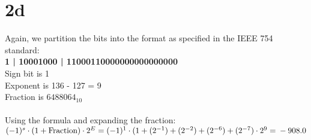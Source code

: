 \documentclass[10pt,a4paper]{article}
\begin{document}
	\section*{2d}
	Again, we partition the bits into the format as specified in the IEEE 754 standard: \\
	\textbf{1 | 10001000 | 11000110000000000000000} \\
	Sign bit is 1 \\
	Exponent is 136 - 127 = 9\\
	Fraction is $6488064_{10}$ \\\\
	Using the formula and expanding the fraction: \\ $(-1)^s \cdot (1 + \text{Fraction}) \cdot 2^E = \\ (-1)^1 \cdot (1 + (2^{-1}) + (2^{-2}) + (2^{-6}) + (2^{-7}) \cdot 2^{9} = \\ -908.0$
	
\end{document}
